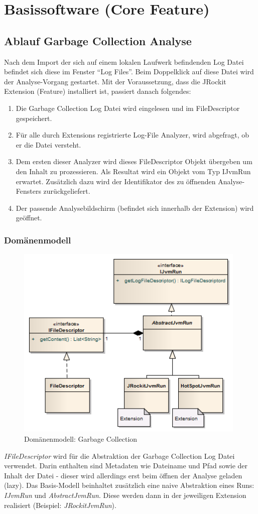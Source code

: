 \section{Basissoftware (Core Feature)}
\subsection{Ablauf Garbage Collection Analyse}
Nach dem Import der sich auf einem lokalen Laufwerk befindenden Log Datei befindet sich diese im Fenster ``Log Files''. Beim Doppelklick auf diese Datei wird der Analyse-Vorgang gestartet. Mit der Voraussetzung, dass die JRockit Extension (Feature) installiert ist, passiert danach folgendes:
\begin{enumerate}
	\item Die Garbage Collection Log Datei wird eingelesen und im FileDescriptor gespeichert.
	\item Für alle durch Extensions registrierte Log-File Analyzer, wird abgefragt, ob er die Datei versteht.
	\item Dem ersten dieser Analyzer wird dieses FileDescriptor Objekt übergeben um den Inhalt zu prozessieren. Als Resultat wird ein Objekt vom Typ IJvmRun erwartet. Zusätzlich dazu wird der Identifikator des zu öffnenden Analyse-Fensters zurückgeliefert.
	\item Der passende Analysebildschirm (befindet sich innerhalb der Extension) wird geöffnet.
\end{enumerate}
\subsubsection{Domänenmodell}
 \begin{figure}[H]
  	\centering
        	\caption{Domänenmodell: Garbage Collection}
    	\includegraphics[width=11cm]{images/core_domain}
\end{figure}
\textit{IFileDescriptor} wird für die Abstraktion der Garbage Collection Log Datei verwendet. Darin enthalten sind Metadaten wie Dateiname und Pfad sowie der Inhalt der Datei - dieser wird allerdings erst beim öffnen der Analyse geladen (lazy). Das Basis-Modell beinhaltet zusätzlich eine naive Abstraktion eines Runs: \textit{IJvmRun} und \textit{AbstractJvmRun}. Diese werden dann in der jeweiligen Extension realisiert (Beispiel: \textit{JRockitJvmRun}). 

